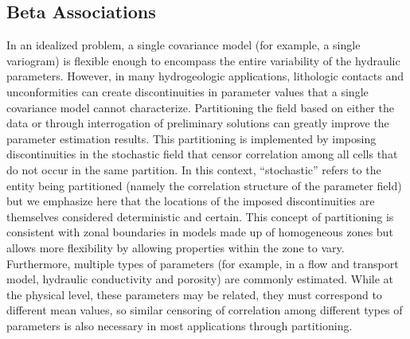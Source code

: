 \documentclass[11pt,oneside,onecolumn]{usgsreport}
\begin{document}
\begin{multicols}{2}
\begin{bibunit}


\subsection{\label{sub:Correlation-Zones}Beta Associations}

In an idealized problem, a single covariance model (for example, a
single variogram) is flexible enough to encompass the entire variability
of the hydraulic parameters. However, in many hydrogeologic applications,
lithologic contacts and unconformities can create discontinuities
in parameter values that a single covariance model cannot characterize.
Partitioning the field based on either the data \citep[e.g. ][]{fienenEtal2004}
or through interrogation of preliminary solutions \citep[e.g. ][]{FienenWRR2008}
can greatly improve the parameter estimation results. This partitioning
is implemented by imposing discontinuities in the stochastic field
that censor correlation among all cells that do not occur in the same
partition. In this context, ``stochastic'' refers to the entity
being partitioned (namely the correlation structure of the parameter
field) but we emphasize here that the locations of the imposed discontinuities
are themselves considered deterministic and certain. This concept
of partitioning is consistent with zonal boundaries in models made
up of homogeneous zones but allows more flexibility by allowing properties
within the zone to vary. Furthermore, multiple types of parameters
(for example, in a flow and transport model, hydraulic conductivity
and porosity) are commonly estimated. While at the physical level,
these parameters may be related, they must correspond to different
mean values, so similar censoring of correlation among different types
of parameters is also necessary in most applications through partitioning.


\end{bibunit}
\end{multicols}
\end{document}
